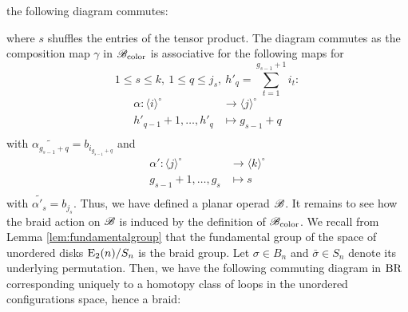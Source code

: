 \begin{eg}
    the following diagram commutes:
    \begin{center}
    \end{center}
    where $s$ shuffles the entries of the tensor product. The diagram commutes
    as the composition map $\gamma$ in $\mathscr{B}_{\text{color}}$ is associative for the following
    maps for 
    \[
    1 \leq s \leq k, \ 1 \leq q \leq j_s, \ h'_q = \sum_{t=1}^{g_{s-1}+1} i_t:
    \]
    \begin{align*}
        \alpha \colon \langle i \rangle^{\circ} &\to \langle j \rangle^{\circ} \\
        h'_{q-1}+1, \dots, h'_q &\mapsto g_{s-1}+q \\
    \end{align*}
    with $\widetilde{\alpha_{g_{s-1}+q}} = b_{i_{g_{s-1}+q}}$ and
    \begin{align*}
        \alpha' \colon \langle j \rangle^{\circ} &\to \langle k \rangle^{\circ} \\
        g_{s-1}+1, \dots, g_s &\mapsto s \\
    \end{align*}
    with $\widetilde{\alpha'_s} = b_{j_s}$. Thus, we have defined a planar
    operad $\mathscr{B}$. It remains to see how the braid action on $\mathscr{B}$ is induced by
    the definition of $\mathscr{B}_{\text{color}}$. We recall from Lemma \ref{lem:fundamentalgroup}
    that the fundamental group of the space of unordered disks $\operatorname{E}_2(n) \slash
    S_n$ is the braid group. Let $\sigma \in B_n$ and $\bar{\sigma} \in S_n$
    denote its underlying permutation. Then, we have the following commuting
    diagram in $\operatorname{BR}$ corresponding uniquely to a homotopy class of loops in the
    unordered configurations space, hence a braid:
    \begin{center}
\end{center}
\end{eg}
